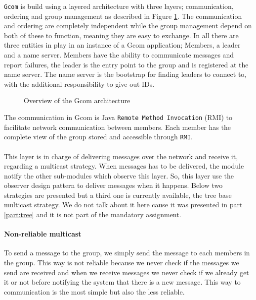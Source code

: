 	\texttt{Gcom} is build using a layered architecture with three layers; communication, ordering and group management as described in Figure \ref{fig:archi_gcom}.
	The communication and ordering are completely independent while the group management depend on both of these to function, meaning they are easy to exchange.
	In all there are three entities in play in an instance of a Gcom application; Members, a leader and a name server.
	Members have the ability to communicate messages and report failures, the leader is the entry point to the group and is registered at the name server.
	The name server is the bootstrap for finding leaders to connect to, with the additional responsibility to give out IDs.

\begin{figure}
	\begin{center}
		
	\end{center}
	\caption{
		Overview of the Gcom architecture
		\label{fig:archi_gcom}
	}
\end{figure}

	The communication in Gcom is Java \texttt{Remote Method Invocation} (RMI) to facilitate network communication between members.
	Each member has the complete view of the group stored and accessible through \texttt{RMI}.







\paragraph{}{
    This layer is in charge of delivering messages over the network and
 receive it, regarding a multicast strategy. When messages has to be
 delivered, the module notify the other sub-modules which observe this
 layer. So, this layer use the observer design pattern to deliver
 messages when it happens. Below two strategies are presented but
 a third one is currently available, the tree base multicast strategy.
 We do not talk about it here cause it was presented in part
 \ref{part:tree} and it is not part of the mandatory assignment.
}

\paragraph{Non-reliable multicast}{
    To send a message to the group, we simply send the message to
 each members in the group. This way is not reliable because we
 never check if the messages we send are received and when we receive
 messages we never check if we already get it or not before notifying
 the system that there is a new message.\newline
 This way to communication is the most simple but also the less reliable.
}
